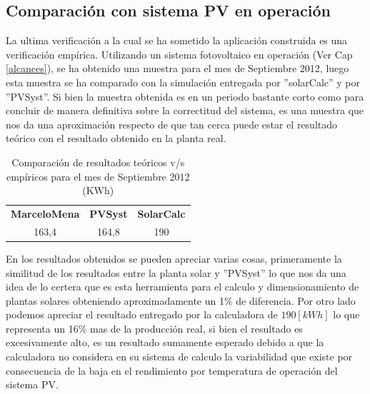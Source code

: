 \newpage
\subsection{Comparación con sistema PV en operación}
La ultima verificación a la cual se ha sometido la aplicación construida es una verificación empírica. Utilizando un sistema fotovoltaico en operación (Ver Cap \ref{alcances}), se ha obtenido una muestra para el mes de Septiembre 2012, luego esta muestra se ha comparado con la simulación entregada por ''solarCalc'' y por ''PVSyst''. Si bien la muestra obtenida es en un periodo bastante corto como para concluir de manera definitiva sobre la correctitud del sistema, es una muestra que nos da una aproximación respecto de que tan cerca puede estar el resultado teórico con el resultado obtenido en la planta real.\\

\begin{table}
\caption{Comparación de resultados teóricos v/s empíricos para el mes de Septiembre 2012 (KWh)}
\centering
\begin{tabular}{|c|c|c|}
        \hline
        \textbf{MarceloMena}&\textbf{PVSyst}&\textbf{SolarCalc}\\
        163,4&    164,8&   190\\
        \hline
\end{tabular}
\end{table}

En los resultados obtenidos se pueden apreciar varias cosas, primeramente la similitud de los resultados entre la planta solar y ''PVSyst'' lo que nos da una idea de lo certera que es esta herramienta para el calculo y dimensionamiento de plantas solares obteniendo aproximadamente un 1\% de diferencia. Por otro lado podemos apreciar el resultado entregado por la calculadora de $190 [kWh]$ lo que representa un 16\% mas de la producción real, si bien el resultado es excesivamente alto, es un resultado sumamente esperado debido a que la calculadora no considera en su sistema de calculo la variabilidad que existe por consecuencia de la baja en el rendimiento por temperatura de operación del sistema PV.


